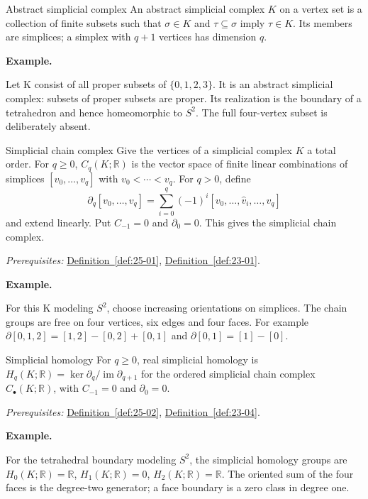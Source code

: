 \documentclass[11pt]{article}
\makeatletter
\newcommand{\R}{\mathbb R}
\newcounter{definition}
\newcommand{\exampleheading}{\par\medskip\textbf{Example.}\par\smallskip}
\newcommand{\currentdefinition}[1]{\protected@edef\@currentlabel{#1}}
\makeatother
\begin{document}
\begin{definitionbox}{Abstract simplicial complex}
\currentdefinition{\thedefinition}
\label{def:25-01}
An abstract simplicial complex $K$ on a vertex set is a collection of finite subsets such that $\sigma\in K$ and $\tau\subseteq\sigma$ imply $\tau\in K$. Its members are simplices; a simplex with $q+1$ vertices has dimension $q$.

\exampleheading
Let K consist of all proper subsets of $\{0,1,2,3\}$. It is an abstract simplicial complex: subsets of proper subsets are proper. Its realization is the boundary of a tetrahedron and hence homeomorphic to $S^2$. The full four-vertex subset is deliberately absent.
\end{definitionbox}

\begin{definitionbox}{Simplicial chain complex}
\currentdefinition{\thedefinition}
\label{def:25-02}
Give the vertices of a simplicial complex $K$ a total order. For $q\ge0$, $C_q(K;\R)$ is the vector space of finite linear combinations of simplices $[v_0,\ldots,v_q]$ with $v_0<\cdots<v_q$. For $q>0$, define
\[\partial_q[v_0,\ldots,v_q]=\sum_{i=0}^q(-1)^i[v_0,\ldots,\widehat v_i,\ldots,v_q]\]
and extend linearly. Put $C_{-1}=0$ and $\partial_0=0$. This gives the simplicial chain complex.

\smallskip
\textit{Prerequisites:} \hyperref[def:25-01]{Definition~\ref*{def:25-01}}, \hyperref[def:23-01]{Definition~\ref*{def:23-01}}.

\exampleheading
For this K modeling $S^2$, choose increasing orientations on simplices. The chain groups are free on four vertices, six edges and four faces. For example $\partial[0,1,2]=[1,2]-[0,2]+[0,1]$ and $\partial[0,1]=[1]-[0]$.
\end{definitionbox}

\begin{definitionbox}{Simplicial homology}
\currentdefinition{\thedefinition}
\label{def:25-03}
For $q\ge0$, real simplicial homology is $H_q(K;\R)=\ker\partial_q/\operatorname{im}\partial_{q+1}$ for the ordered simplicial chain complex $C_\bullet(K;\R)$, with $C_{-1}=0$ and $\partial_0=0$.

\smallskip
\textit{Prerequisites:} \hyperref[def:25-02]{Definition~\ref*{def:25-02}}, \hyperref[def:23-04]{Definition~\ref*{def:23-04}}.

\exampleheading
For the tetrahedral boundary modeling $S^2$, the simplicial homology groups are $H_0(K;\R)=\R$, $H_1(K;\R)=0$, $H_2(K;\R)=\R$. The oriented sum of the four faces is the degree-two generator; a face boundary is a zero class in degree one.
\end{definitionbox}
\end{document}
